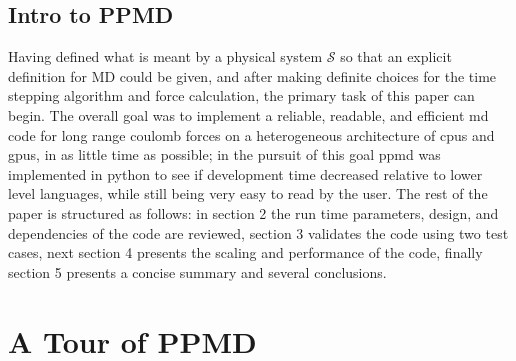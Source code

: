\documentclass[%
 reprint,
 amsmath,amssymb,
 aps,
pra,
prb,
rmp,
prstab,
prstper,
]{revtex4-1}
\begin{document}
\subsection{\label{sec:level2}Intro to PPMD}
Having defined what is meant by a physical system $\mathcal{S}$ so that an explicit
definition for MD could be given, and after making definite choices for the time stepping algorithm and force calculation, the primary task of this paper can begin.
The overall goal was to implement a reliable, readable, and efficient md code for long 
range coulomb forces on a heterogeneous architecture of cpus and gpus, in as little 
time as  possible; in the pursuit of this goal ppmd was implemented in python to see if 
development time decreased relative to lower level languages, while still being
very easy to read by the user. The rest of the paper is structured as follows:
in section 2 the run time parameters, design, and dependencies of the code are 
reviewed, section 3 validates the code using two test cases, next section 4
presents the scaling and performance of the code, finally section 5
presents a concise summary and several conclusions. 


\section{\label{sec:level1}A Tour of PPMD}
\end{document}
